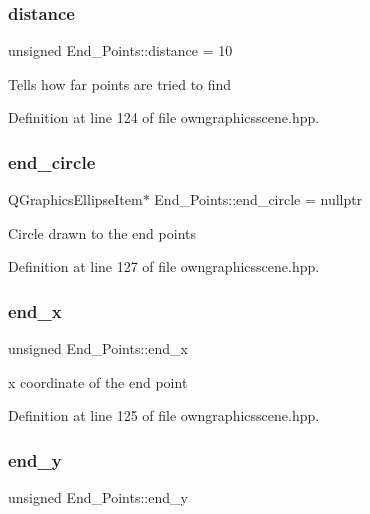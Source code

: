 \subsubsection{\texorpdfstring{distance}{distance}}
{\footnotesize\ttfamily unsigned End\+\_\+\+Points\+::distance = 10}

Tells how far points are tried to find 

Definition at line 124 of file owngraphicsscene.\+hpp.

\mbox{\label{structEnd__Points_abf301947140c1584823b50071c7b8ee6}} 
\subsubsection{\texorpdfstring{end\+\_\+circle}{end\_circle}}
{\footnotesize\ttfamily Q\+Graphics\+Ellipse\+Item$\ast$ End\+\_\+\+Points\+::end\+\_\+circle = nullptr}

Circle drawn to the end points 

Definition at line 127 of file owngraphicsscene.\+hpp.

\mbox{\label{structEnd__Points_a2b33a99792ec437e7c2369ceaf435176}} 
\subsubsection{\texorpdfstring{end\+\_\+x}{end\_x}}
{\footnotesize\ttfamily unsigned End\+\_\+\+Points\+::end\+\_\+x}

x coordinate of the end point 

Definition at line 125 of file owngraphicsscene.\+hpp.

\mbox{\label{structEnd__Points_a04207ee9a97ee6d785b493305cd9e7e8}} 
\subsubsection{\texorpdfstring{end\+\_\+y}{end\_y}}
{\footnotesize\ttfamily unsigned End\+\_\+\+Points\+::end\+\_\+y}

